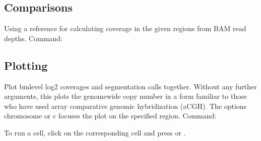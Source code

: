 \documentclass[letterpaper,10pt,english]{sphinxhowto}
\begin{document}
\subsection{Comparisons}
\label{\detokenize{index:comparisons}}
\sphinxAtStartPar
Using a reference for calculating coverage in the given regions from BAM read depths. Command:

\begin{sphinxVerbatim}[commandchars=\\\{\}]
   \PYGZbs{}
  \PYGZbs{}
 
 
\end{sphinxVerbatim}


\subsection{Plotting}
\label{\detokenize{index:plotting}}
\sphinxAtStartPar
Plot bin\sphinxhyphen{}level log2 coverages and segmentation calls together. Without any further arguments, this plots the genome\sphinxhyphen{}wide copy number in a form familiar to those who have used array comparative genomic hybridization (aCGH). The options \textendash{}chromosome or \sphinxhyphen{}c focuses the plot on the specified region. Command:

\begin{sphinxVerbatim}[commandchars=\\\{\}]
   \PYGZbs{}
  \PYGZbs{}
 
 
 
\end{sphinxVerbatim}

\sphinxAtStartPar
To run a cell, click on the corresponding cell and press  or .
\end{document}

